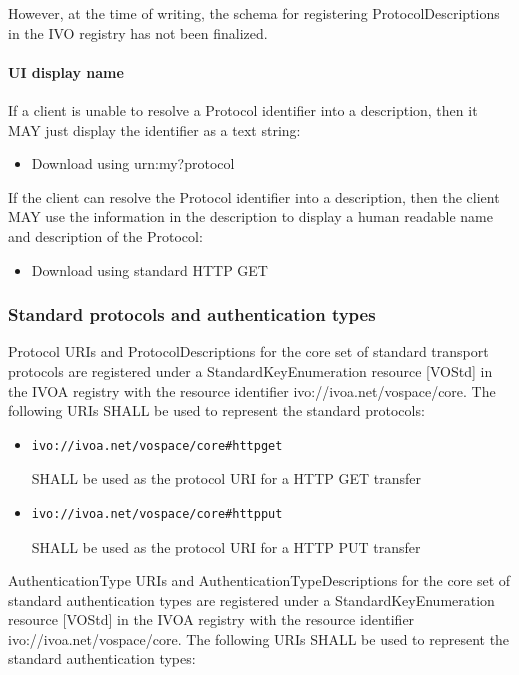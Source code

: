 \documentclass[11pt,a4paper]{ivoa}
\begin{document}
However, at the time of writing, the schema for registering ProtocolDescriptions in the IVO registry has not been finalized.

\paragraph{UI display name}

If a client is unable to resolve a Protocol identifier into a description, then it MAY just display the identifier as a text string:

\begin{itemize}
    \item Download using urn:my?protocol
\end{itemize}

If the client can resolve the Protocol identifier into a description, then the client MAY use the information in the description to display a human readable name and description of the Protocol:

\begin{itemize}
    \item Download using standard HTTP GET
\end{itemize}

\subsubsection{Standard protocols and authentication types}
Protocol URIs and ProtocolDescriptions for the core set of standard transport protocols are registered under a StandardKeyEnumeration resource [VOStd] in the IVOA registry with the resource identifier ivo://ivoa.net/vospace/core. The following URIs SHALL be used to represent the standard protocols:

\begin{itemize}
    \item \begin{verbatim}ivo://ivoa.net/vospace/core#httpget\end{verbatim} SHALL be used as the protocol URI for a HTTP GET transfer
    \item \begin{verbatim}ivo://ivoa.net/vospace/core#httpput\end{verbatim} SHALL be used as the protocol URI for a HTTP PUT transfer
\end{itemize}

AuthenticationType URIs and AuthenticationTypeDescriptions for the core set of standard authentication types are registered under a StandardKeyEnumeration resource [VOStd] in the IVOA registry with the resource identifier ivo://ivoa.net/vospace/core. The following URIs SHALL be used to represent the standard authentication types:
\end{document}
